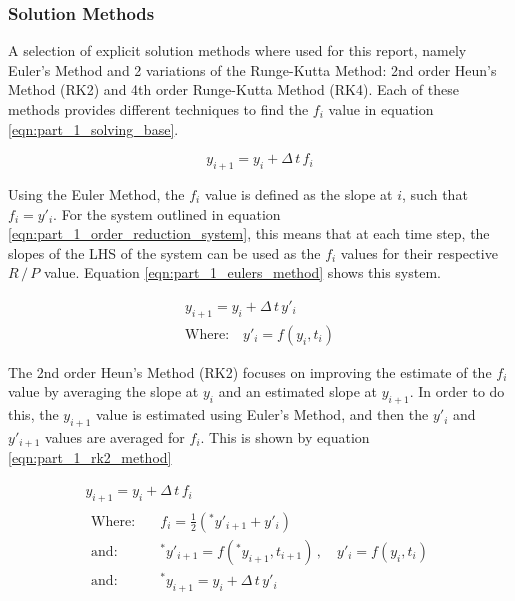 \documentclass[12pt]{article}
\begin{document}
\subsubsection{Solution Methods} \label{sec:part_1_solution_methods}
A selection of explicit solution methods where used for this report, namely Euler's Method and 2 variations of the Runge-Kutta Method: 2nd order Heun's Method (RK2) and 4th order Runge-Kutta Method (RK4). Each of these methods provides different techniques to find the $f_i$ value in equation \ref{eqn:part_1_solving_base}.

\begin{equation}
    \label{eqn:part_1_solving_base}
    y_{i+1} = y_i + \Delta \, t \, f_i
\end{equation}

Using the Euler Method, the $f_i$ value is defined as the slope at $i$, such that $f_i = y'_i$. For the system outlined in equation \ref{eqn:part_1_order_reduction_system}, this means that at each time step, the slopes of the LHS of the system can be used as the $f_i$ values for their respective $R \, / \, P$ value. Equation \ref{eqn:part_1_eulers_method} shows this system.

\begin{equation}
    \label{eqn:part_1_eulers_method}
    \begin{gathered}
        y_{i+1} = y_i + \Delta \, t \, y'_i \\
        \text{Where:} \quad y'_i = f(y_i, t_i)
    \end{gathered}
\end{equation}

The 2nd order Heun's Method (RK2) focuses on improving the estimate of the $f_i$ value by averaging the slope at $y_i$ and an estimated slope at $y_{i+1}$. In order to do this, the $y_{i+1}$ value is estimated using Euler's Method, and then the $y'_i$ and $y'_{i+1}$ values are averaged for $f_i$. This is shown by equation \ref{eqn:part_1_rk2_method}

\begin{equation}
    \label{eqn:part_1_rk2_method}
    \begin{gathered}
        y_{i+1} = y_i + \Delta \, t \, f_i \\
        \begin{aligned}
            \text{Where:} & \quad f_i = \frac{1}{2} \left( ^*y'_{i+1} + y'_{i}\right) \\
            \text{and:} & \quad ^*y'_{i+1} = f(^*y_{i+1}, t_{i+1}) \, , \quad y'_{i} = f(y_i, t_i) \\
            \text{and:} & \quad ^*y_{i+1} = y_i + \Delta \, t \, y'_{i}
        \end{aligned}
    \end{gathered}
\end{equation}
\end{document}
